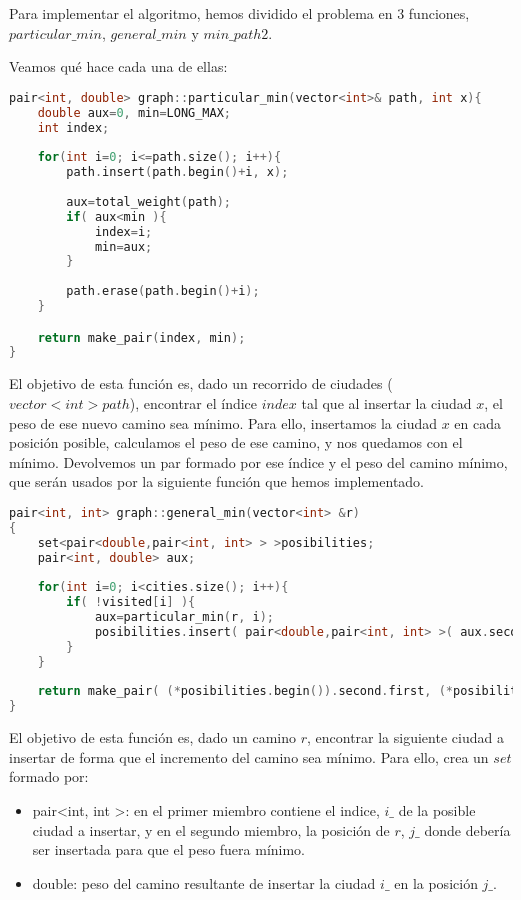 \documentclass[11pt]{article}
\begin{document}
Para implementar el algoritmo, hemos dividido el problema en 3 funciones, $particular\_min$, $general\_min$ y $min\_path2$.

Veamos qué hace cada una de ellas:

\begin{lstlisting}[language=C++, caption=particular\_min]
pair<int, double> graph::particular_min(vector<int>& path, int x){
	double aux=0, min=LONG_MAX; 
	int index;
	
	for(int i=0; i<=path.size(); i++){
		path.insert(path.begin()+i, x);
		
		aux=total_weight(path);
		if( aux<min ){
			index=i;
			min=aux;
		}
		
		path.erase(path.begin()+i);
	}  

	return make_pair(index, min);
}
\end{lstlisting}

El objetivo de esta función es, dado un recorrido de ciudades ($vector<int> path$), encontrar el índice $index$ tal que al insertar la ciudad $x$, el peso de ese nuevo camino sea mínimo.
Para ello, insertamos la ciudad $x$ en cada posición posible, calculamos el peso de ese camino, y nos quedamos con el mínimo.
Devolvemos un par formado por ese índice y el peso del camino mínimo, que serán usados por la siguiente función que hemos implementado.

\begin{lstlisting}[language=C++, caption=general\_min]
pair<int, int> graph::general_min(vector<int> &r)
{
	set<pair<double,pair<int, int> > >posibilities;
	pair<int, double> aux;
	
	for(int i=0; i<cities.size(); i++){
		if( !visited[i] ){
			aux=particular_min(r, i);
			posibilities.insert( pair<double,pair<int, int> >( aux.second, make_pair(i, aux.first) ) );
		}
	}
	
	return make_pair( (*posibilities.begin()).second.first, (*posibilities.begin()).second.second );
}
\end{lstlisting}

El objetivo de esta función es, dado un camino $r$, encontrar la siguiente ciudad a insertar de forma que el incremento del camino sea mínimo. Para ello, crea un $set$ formado por:
\begin{itemize}
	\item pair\textless int, int \textgreater: en el primer miembro contiene el indice, $i\_$ de la posible ciudad a insertar, y en el segundo miembro, la posición de $r$, $j\_$ donde debería ser insertada para que el peso fuera mínimo.
	\item double: peso del camino resultante de insertar la ciudad $i\_$ en la posición $j\_$. 
\end{itemize}
\end{document}
